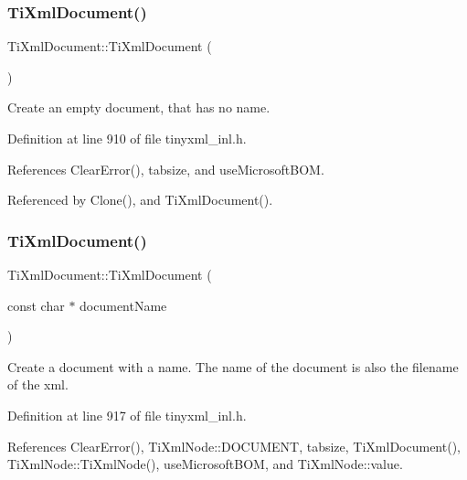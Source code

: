 \subsubsection{\texorpdfstring{Ti\+Xml\+Document()}{TiXmlDocument()}\hspace{0.1cm}{\footnotesize\ttfamily [1/4]}}
{\footnotesize\ttfamily Ti\+Xml\+Document\+::\+Ti\+Xml\+Document (\begin{DoxyParamCaption}{ }\end{DoxyParamCaption})}



Create an empty document, that has no name. 



Definition at line 910 of file tinyxml\+\_\+inl.\+h.



References Clear\+Error(), tabsize, and use\+Microsoft\+B\+OM.



Referenced by Clone(), and Ti\+Xml\+Document().

\hypertarget{class_ti_xml_document_ae4508b452d0c3061db085f3db27b8396}{}\label{class_ti_xml_document_ae4508b452d0c3061db085f3db27b8396} 
\subsubsection{\texorpdfstring{Ti\+Xml\+Document()}{TiXmlDocument()}\hspace{0.1cm}{\footnotesize\ttfamily [2/4]}}
{\footnotesize\ttfamily Ti\+Xml\+Document\+::\+Ti\+Xml\+Document (\begin{DoxyParamCaption}\item[{const char $\ast$}]{document\+Name }\end{DoxyParamCaption})}



Create a document with a name. The name of the document is also the filename of the xml. 



Definition at line 917 of file tinyxml\+\_\+inl.\+h.



References Clear\+Error(), Ti\+Xml\+Node\+::\+D\+O\+C\+U\+M\+E\+NT, tabsize, Ti\+Xml\+Document(), Ti\+Xml\+Node\+::\+Ti\+Xml\+Node(), use\+Microsoft\+B\+OM, and Ti\+Xml\+Node\+::value.


